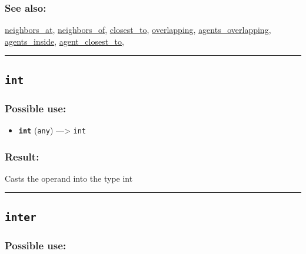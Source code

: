 \documentclass[]{book}
\providecommand{\tightlist}{%
  \setlength{\itemsep}{0pt}\setlength{\parskip}{0pt}}
\theoremstyle{definition}
\theoremstyle{definition}
\theoremstyle{definition}
\theoremstyle{remark}
\begin{document}
\subsubsection{See also:}\label{see-also-118}

\href{OperatorsNR\#neighbors_at}{neighbors\_at},
\href{OperatorsNR\#neighbors_of}{neighbors\_of},
\href{OperatorsBC\#closest_to}{closest\_to},
\href{OperatorsNR\#overlapping}{overlapping},
\href{OperatorsAA\#agents_overlapping}{agents\_overlapping},
\href{OperatorsAA\#agents_inside}{agents\_inside},
\href{OperatorsAA\#agent_closest_to}{agent\_closest\_to},

\begin{center}\rule{0.5\linewidth}{\linethickness}\end{center}

\subsection{\texorpdfstring{\texttt{int}}{int}}\label{int}

\subsubsection{Possible use:}\label{possible-use-276}

\begin{itemize}
\tightlist
\item
  \textbf{\texttt{int}} (\texttt{any}) ---\textgreater{} \texttt{int}
\end{itemize}

\subsubsection{Result:}\label{result-266}

Casts the operand into the type int

\begin{center}\rule{0.5\linewidth}{\linethickness}\end{center}

\subsection{\texorpdfstring{\texttt{inter}}{inter}}\label{inter}

\subsubsection{Possible use:}\label{possible-use-277}
\end{document}
